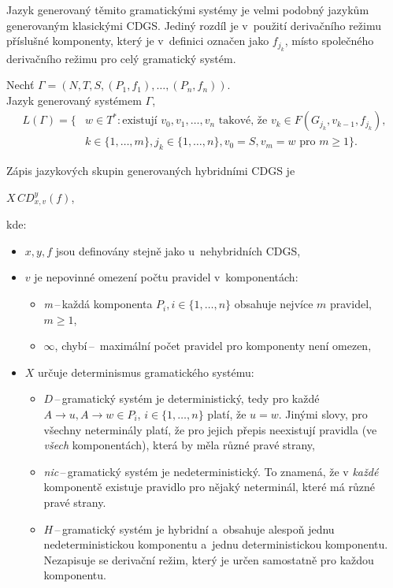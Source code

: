 Jazyk generovaný těmito gramatickými systémy je velmi podobný jazykům generovaným klasickými CDGS.
Jediný rozdíl je v~použití derivačního režimu příslušné komponenty, který je v~definici označen jako $f_{j_k}$, místo společného derivačního režimu pro celý gramatický systém.
\begin{definition}
    Nechť $\Gamma = (N, T, S, (P_1, f_1), \ldots, (P_n, f_n))$.\\
    Jazyk generovaný systémem $\Gamma$,
    \begin{align*}
        L(\Gamma) = \{&w \in T^*: \text{existují } v_0, v_1,\ldots, v_n \text{ takové, že } v_k \in F(G_{j_k}, v_{k-1}, f_{j_k}),\\
        &k \in \{1, \ldots, m\}, j_k \in \{1, \ldots, n\}, v_0 = S, v_m = w \text{ pro } m \geq 1\}.
    \end{align*}
\end{definition}

Zápis jazykových skupin generovaných hybridními CDGS je
\begin{center}
    $X\,CD^y_{x, v}(f) $, 
\end{center}
kde:
\begin{itemize}
    \item $x, y, f$ jsou definovány stejně jako u~nehybridních CDGS,
    \item $v$ je nepovinné omezení počtu pravidel v~komponentách:
    \begin{itemize}[label=$\circ$]
        \item \emph{m}\,--\,každá komponenta $P_i, i \in \{1, \ldots, n\}$ obsahuje nejvíce $m$ pravidel, $m \geq 1$,
        \item $\infty$, chybí\,--\, maximální počet pravidel pro komponenty není omezen,
    \end{itemize}
    \item $X$ určuje determinismus gramatického systému:
    \begin{itemize}[label=$\circ$]
        \item $D$\,--\,gramatický systém je deterministický, tedy pro každé $A \rightarrow u, A \rightarrow w \in P_i$, $i \in \{1, \ldots, n\}$ platí, že $u = w$.
        Jinými slovy, pro všechny neterminály platí, že pro jejich přepis neexistují pravidla (ve \emph{všech} komponentách), která by měla různé pravé strany,
        \item \emph{nic}\,--\,gramatický systém je nedeterministický.
        To znamená, že v \emph{každé} komponentě existuje pravidlo pro nějaký neterminál, které má různé pravé strany.
        \item $H$\,--\,gramatický systém je hybridní a~obsahuje alespoň jednu nedeterministickou komponentu a~jednu deterministickou komponentu.
        Nezapisuje se derivační režim, který je určen samostatně pro každou komponentu. 
    \end{itemize}
\end{itemize}

